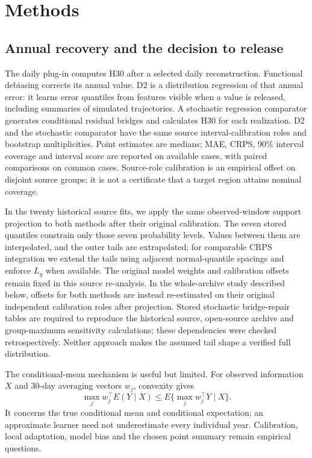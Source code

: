 \documentclass[draft,linenumbers]{agujournal2025}
\begin{document}



\section{Methods}
\subsection{Annual recovery and the decision to release}
The daily plug-in computes H30 after a selected daily reconstruction. Functional debiasing corrects its annual value. D2 is a distribution regression of that annual error: it learns error quantiles from features visible when a value is released, including summaries of simulated trajectories. A stochastic regression comparator generates conditional residual bridges and calculates H30 for each realization. D2 and the stochastic comparator have the same source interval-calibration roles and bootstrap multiplicities. Point estimates are medians; MAE, CRPS, 90\% interval coverage and interval score are reported on available cases, with paired comparisons on common cases. Source-role calibration is an empirical offset on disjoint source groups; it is not a certificate that a target region attains nominal coverage.

In the twenty historical source fits, we apply the same observed-window support projection to both methods after their original calibration. The seven stored quantiles constrain only those seven probability levels. Values between them are interpolated, and the outer tails are extrapolated; for comparable CRPS integration we extend the tails using adjacent normal-quantile spacings and enforce $L_y$ when available. The original model weights and calibration offsets remain fixed in this source re-analysis. In the whole-archive study described below, offsets for both methods are instead re-estimated on their original independent calibration roles after projection. Stored stochastic bridge-repair tables are required to reproduce the historical source, open-source archive and group-maximum sensitivity calculations; these dependencies were checked retrospectively. Neither approach makes the assumed tail shape a verified full distribution.

The conditional-mean mechanism is useful but limited. For observed information $X$ and 30-day averaging vectors $w_j$, convexity gives
\[
 \max_j w_j^\top E(Y\mid X)\le E\{\max_j w_j^\top Y\mid X\}.
\]
It concerns the true conditional mean and conditional expectation; an approximate learner need not underestimate every individual year. Calibration, local adaptation, model bias and the chosen point summary remain empirical questions.
\end{document}
